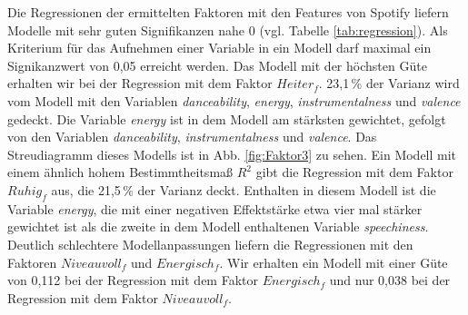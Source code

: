 Die Regressionen der ermittelten Faktoren mit den Features von Spotify liefern Modelle mit sehr guten Signifikanzen nahe 0 (vgl. Tabelle \ref{tab:regression}).
Als Kriterium für das Aufnehmen einer Variable in ein Modell darf maximal ein Signikanzwert von 0,05 erreicht werden.  
Das Modell mit der höchsten Güte erhalten wir bei der Regression mit dem Faktor $Heiter_f$.
23,1\,\% der Varianz wird vom Modell mit den Variablen \textit{danceability}, \textit{energy}, \textit{instrumentalness} und \textit{valence} gedeckt.
Die Variable \textit{energy} ist in dem Modell am stärksten gewichtet, gefolgt von den Variablen \textit{danceability},  \textit{instrumentalness} und \textit{valence}.
Das Streudiagramm dieses Modells ist in Abb. \ref{fig:Faktor3} zu sehen.    
Ein Modell mit einem ähnlich hohem Bestimmtheitsmaß $R^2$ gibt die Regression mit dem Faktor $Ruhig_f$ aus, die 21,5\,\% der Varianz deckt.
Enthalten in diesem Modell ist die Variable \textit{energy}, die mit einer negativen Effektstärke etwa vier mal stärker gewichtet ist als die zweite in dem Modell enthaltenen Variable \textit{speechiness}.
Deutlich schlechtere Modellanpassungen liefern die Regressionen mit den Faktoren $Niveauvoll_f$ und $Energisch_f$.
Wir erhalten ein Modell mit einer Güte von 0,112 bei der Regression mit dem Faktor $Energisch_f$ und nur 0,038 bei der Regression mit dem Faktor $Niveauvoll_f$.


